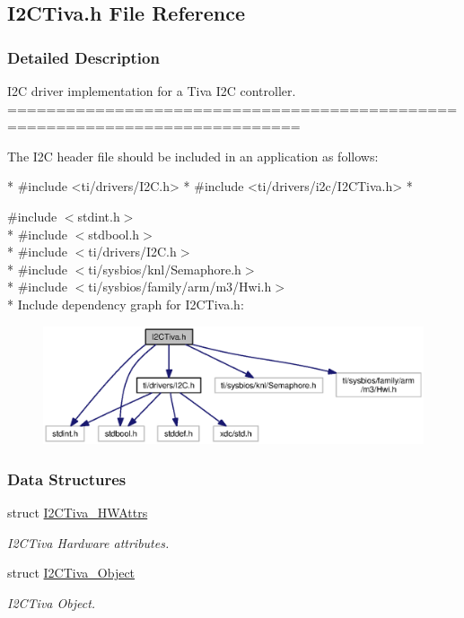 \subsection{I2\-C\-Tiva.\-h File Reference}
\label{_i2_c_tiva_8h}


\subsubsection{Detailed Description}
I2\-C driver implementation for a Tiva I2\-C controller. ============================================================================

The I2\-C header file should be included in an application as follows\-: 
\begin{DoxyCode}
*  #include <ti/drivers/I2C.h>
*  #include <ti/drivers/i2c/I2CTiva.h>
*  
\end{DoxyCode}
 

{\ttfamily \#include $<$stdint.\-h$>$}\\*
{\ttfamily \#include $<$stdbool.\-h$>$}\\*
{\ttfamily \#include $<$ti/drivers/\-I2\-C.\-h$>$}\\*
{\ttfamily \#include $<$ti/sysbios/knl/\-Semaphore.\-h$>$}\\*
{\ttfamily \#include $<$ti/sysbios/family/arm/m3/\-Hwi.\-h$>$}\\*
Include dependency graph for I2\-C\-Tiva.\-h\-:
\nopagebreak
\begin{figure}[H]
\begin{center}
\leavevmode
\includegraphics[width=350pt]{_i2_c_tiva_8h__incl}
\end{center}
\end{figure}
\subsubsection*{Data Structures}
\begin{DoxyCompactItemize}
\item 
struct \hyperlink{struct_i2_c_tiva___h_w_attrs}{I2\-C\-Tiva\-\_\-\-H\-W\-Attrs}
\begin{DoxyCompactList}\small\item\em I2\-C\-Tiva Hardware attributes. \end{DoxyCompactList}\item 
struct \hyperlink{struct_i2_c_tiva___object}{I2\-C\-Tiva\-\_\-\-Object}
\begin{DoxyCompactList}\small\item\em I2\-C\-Tiva Object. \end{DoxyCompactList}\end{DoxyCompactItemize}

